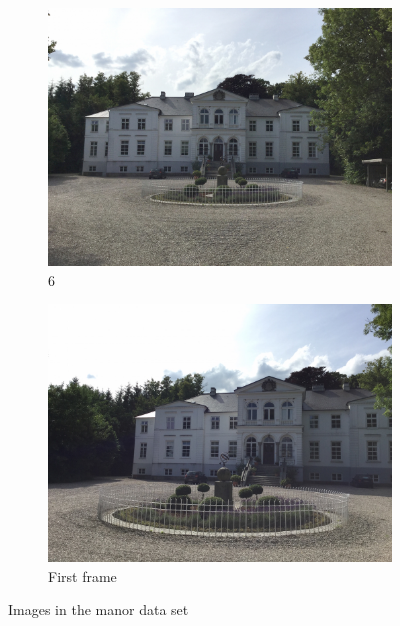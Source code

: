 \begin{figure}[h]
   \begin{subfigure}{.33\textwidth}
      \includegraphics[width=\textwidth]{gfx/manor_imgs/9.JPG}
      \caption{$6$}
   \end{subfigure}
   \begin{subfigure}{.33\textwidth}
      \includegraphics[width=\textwidth]{gfx/manor_imgs/first_frame_centered.JPG}
      \caption{First frame}
   \end{subfigure}
   \caption[Manor images]{Images in the manor data set}
   \label{fig:train_imgs}
\end{figure}
\FloatBarrier

